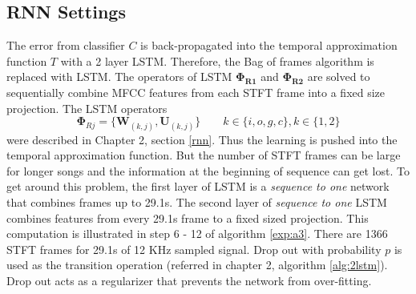 \subsection{RNN Settings}
The error from classifier $C$ is back-propagated into the temporal approximation function $T$ with a 2 layer LSTM. Therefore, the Bag of frames algorithm is replaced with LSTM. The operators of LSTM $\bm{\Phi_{R1}}$ and $\bm{\Phi_{R2}}$ are solved to sequentially combine MFCC features from each STFT frame into a fixed size projection. The LSTM operators
\[
\bm{\Phi}_{Rj} = \{\textbf{W}_{(k,j)}, \textbf{U}_{(k,j)}\} \qquad k \in \{i,o,g,c\}, k \in \{1,2\}
\] 
were described in Chapter 2, section \ref{rnn}. Thus the learning is pushed into the temporal approximation function. But the number of STFT frames can be large for longer songs and the information at the beginning of sequence can get lost. To get around this problem, the first layer of LSTM is a \textit{sequence to one} network that combines frames up to 29.1s. The second layer of \textit{sequence to one} LSTM combines features from every 29.1s frame to a fixed sized projection. This computation is illustrated in step 6 - 12 of algorithm \ref{exp:a3}. There are 1366 STFT frames for 29.1s of 12 KHz sampled signal. Drop out with probability $p$ is used as the transition operation (referred in chapter 2, algorithm \ref{alg:2lstm}). Drop out acts as a regularizer that prevents the network from over-fitting.
